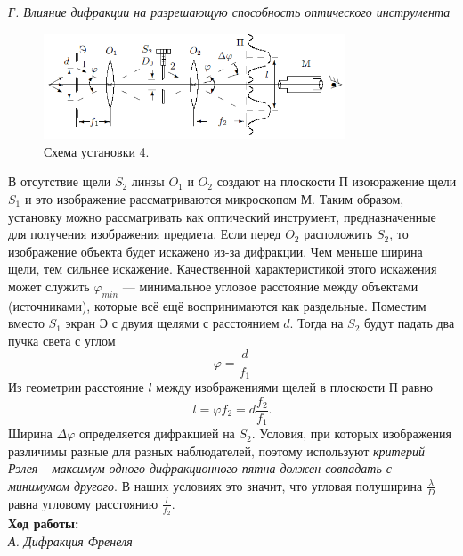 \documentclass[a4paper, 12pt]{article}%
\begin{document}
	 
	 \textit{Г. Влияние дифракции на разрешающую способность оптического инструмента}\\
	 
	 
	 \begin{figure}[h]
	 	\includegraphics[width = 0.8\textwidth]{5.png}
	 	\centering
	 	\caption{Схема установки 4.}
	 \end{figure}
	 В отсутствие щели $S_2$ линзы $O_1$ и $O_2$ создают на плоскости П изоюражение щели $S_1$ и это изображение рассматриваются микроскопом М. Таким образом, установку можно рассматривать как оптический инструмент, предназначенные для получения изображения предмета. Если перед $O_2$ расположить $S_2$, то изображение объекта будет искажено из-за дифракции. Чем меньше ширина щели, тем сильнее искажение. Качественной характеристикой этого искажения может служить $\varphi_{min}$ --- минимальное угловое расстояние между объектами (источниками), которые всё ещё воспринимаются как раздельные. Поместим вместо $S_1$ экран Э с двумя щелями с расстоянием $d$. Тогда на $S_2$ будут падать два пучка света с углом
	 \begin{equation}
	 	\varphi = \dfrac{d}{f_1}
	 \end{equation}
	 Из геометрии расстояние $l$ между изображениями щелей в плоскости П равно 
	 \begin{equation}
	 	l = \varphi f_2 = d \dfrac{f_2}{f_1}.
	 \end{equation}
	 Ширина $\Delta \varphi$ определяется дифракцией на $S_2$. Условия, при которых изображения различимы разные для разных наблюдателей, поэтому используют \textit{критерий Рэлея} -- \textit{максимум одного дифракционного пятна должен совпадать с минимумом другого}. В наших условиях это значит, что угловая полуширина $\frac{\lambda}{D}$ равна угловому расстоянию $\frac{l}{f_2}$.\\
	 
	 
\textbf{Ход работы: }\\
	 
\textit{А. Дифракция Френеля}\\
	
\end{document}
